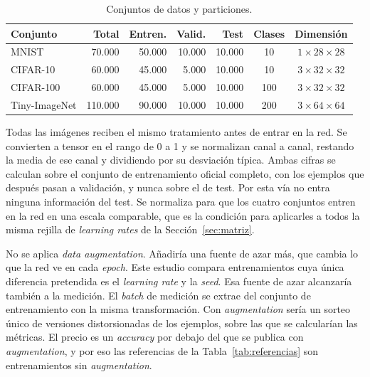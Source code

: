 \begin{table}[ht]
\centering
\small
\caption{Conjuntos de datos y particiones.}
\label{tab:datasets}
\begin{tabular}{lrrrrcc}
\toprule
\textbf{Conjunto} & \textbf{Total} & \textbf{Entren.} & \textbf{Valid.} & \textbf{Test} & \textbf{Clases} & \textbf{Dimensión} \\
\midrule
MNIST          & 70.000  & 50.000 & 10.000 & 10.000 & 10  & $1{\times}28{\times}28$ \\
CIFAR-10       & 60.000  & 45.000 & 5.000  & 10.000 & 10  & $3{\times}32{\times}32$ \\
CIFAR-100      & 60.000  & 45.000 & 5.000  & 10.000 & 100 & $3{\times}32{\times}32$ \\
Tiny-ImageNet  & 110.000 & 90.000 & 10.000 & 10.000 & 200 & $3{\times}64{\times}64$ \\
\bottomrule
\end{tabular}
\end{table}

Todas las imágenes reciben el mismo tratamiento antes de entrar en la red. Se convierten a tensor en el rango de 0 a 1 y se normalizan canal a canal, restando la media de ese canal y dividiendo por su desviación típica. Ambas cifras se calculan sobre el conjunto de entrenamiento oficial completo, con los ejemplos que después pasan a validación, y nunca sobre el de test. Por esta vía no entra ninguna información del test. Se normaliza para que los cuatro conjuntos entren en la red en una escala comparable, que es la condición para aplicarles a todos la misma rejilla de \emph{learning rates} de la Sección~\ref{sec:matriz}.

No se aplica \emph{data augmentation}. Añadiría una fuente de azar más, que cambia lo que la red ve en cada \emph{epoch}. Este estudio compara entrenamientos cuya única diferencia pretendida es el \emph{learning rate} y la \emph{seed}. Esa fuente de azar alcanzaría también a la medición. El \emph{batch} de medición se extrae del conjunto de entrenamiento con la misma transformación. Con \emph{augmentation} sería un sorteo único de versiones distorsionadas de los ejemplos, sobre las que se calcularían las métricas. El precio es un \emph{accuracy} por debajo del que se publica con \emph{augmentation}, y por eso las referencias de la Tabla~\ref{tab:referencias} son entrenamientos sin \emph{augmentation}.


